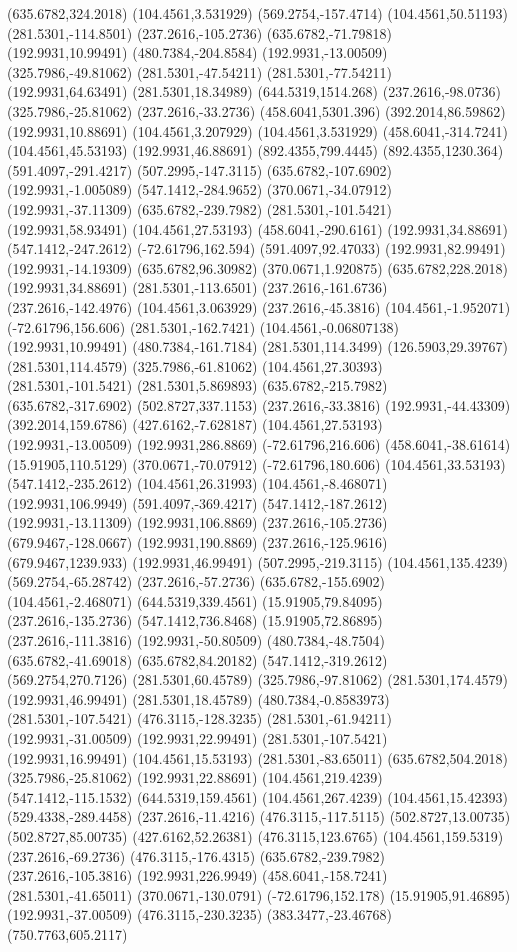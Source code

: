 \documentclass[12pt,letterpaper]{article}
\begin{document}
(635.6782,324.2018) (104.4561,3.531929) (569.2754,-157.4714) (104.4561,50.51193) (281.5301,-114.8501) (237.2616,-105.2736) (635.6782,-71.79818) (192.9931,10.99491) (480.7384,-204.8584) (192.9931,-13.00509) (325.7986,-49.81062) (281.5301,-47.54211) (281.5301,-77.54211) (192.9931,64.63491) (281.5301,18.34989) (644.5319,1514.268) (237.2616,-98.0736) (325.7986,-25.81062) (237.2616,-33.2736) (458.6041,5301.396) (392.2014,86.59862) (192.9931,10.88691) (104.4561,3.207929) (104.4561,3.531929) (458.6041,-314.7241) (104.4561,45.53193) (192.9931,46.88691) (892.4355,799.4445) (892.4355,1230.364) (591.4097,-291.4217) (507.2995,-147.3115) (635.6782,-107.6902) (192.9931,-1.005089) (547.1412,-284.9652) (370.0671,-34.07912) (192.9931,-37.11309) (635.6782,-239.7982) (281.5301,-101.5421) (192.9931,58.93491) (104.4561,27.53193) (458.6041,-290.6161) (192.9931,34.88691) (547.1412,-247.2612) (-72.61796,162.594) (591.4097,92.47033) (192.9931,82.99491) (192.9931,-14.19309) (635.6782,96.30982) (370.0671,1.920875) (635.6782,228.2018) (192.9931,34.88691) (281.5301,-113.6501) (237.2616,-161.6736) (237.2616,-142.4976) (104.4561,3.063929) (237.2616,-45.3816) (104.4561,-1.952071) (-72.61796,156.606) (281.5301,-162.7421) (104.4561,-0.06807138) (192.9931,10.99491) (480.7384,-161.7184) (281.5301,114.3499) (126.5903,29.39767) (281.5301,114.4579) (325.7986,-61.81062) (104.4561,27.30393) (281.5301,-101.5421) (281.5301,5.869893) (635.6782,-215.7982) (635.6782,-317.6902) (502.8727,337.1153) (237.2616,-33.3816) (192.9931,-44.43309) (392.2014,159.6786) (427.6162,-7.628187) (104.4561,27.53193) (192.9931,-13.00509) (192.9931,286.8869) (-72.61796,216.606) (458.6041,-38.61614) (15.91905,110.5129) (370.0671,-70.07912) (-72.61796,180.606) (104.4561,33.53193) (547.1412,-235.2612) (104.4561,26.31993) (104.4561,-8.468071) (192.9931,106.9949) (591.4097,-369.4217) (547.1412,-187.2612) (192.9931,-13.11309) (192.9931,106.8869) (237.2616,-105.2736) (679.9467,-128.0667) (192.9931,190.8869) (237.2616,-125.9616) (679.9467,1239.933) (192.9931,46.99491) (507.2995,-219.3115) (104.4561,135.4239) (569.2754,-65.28742) (237.2616,-57.2736) (635.6782,-155.6902) (104.4561,-2.468071) (644.5319,339.4561) (15.91905,79.84095) (237.2616,-135.2736) (547.1412,736.8468) (15.91905,72.86895) (237.2616,-111.3816) (192.9931,-50.80509) (480.7384,-48.7504) (635.6782,-41.69018) (635.6782,84.20182) (547.1412,-319.2612) (569.2754,270.7126) (281.5301,60.45789) (325.7986,-97.81062) (281.5301,174.4579) (192.9931,46.99491) (281.5301,18.45789) (480.7384,-0.8583973) (281.5301,-107.5421) (476.3115,-128.3235) (281.5301,-61.94211) (192.9931,-31.00509) (192.9931,22.99491) (281.5301,-107.5421) (192.9931,16.99491) (104.4561,15.53193) (281.5301,-83.65011) (635.6782,504.2018) (325.7986,-25.81062) (192.9931,22.88691) (104.4561,219.4239) (547.1412,-115.1532) (644.5319,159.4561) (104.4561,267.4239) (104.4561,15.42393) (529.4338,-289.4458) (237.2616,-11.4216) (476.3115,-117.5115) (502.8727,13.00735) (502.8727,85.00735) (427.6162,52.26381) (476.3115,123.6765) (104.4561,159.5319) (237.2616,-69.2736) (476.3115,-176.4315) (635.6782,-239.7982) (237.2616,-105.3816) (192.9931,226.9949) (458.6041,-158.7241) (281.5301,-41.65011) (370.0671,-130.0791) (-72.61796,152.178) (15.91905,91.46895) (192.9931,-37.00509) (476.3115,-230.3235) (383.3477,-23.46768) (750.7763,605.2117) 
\end{document}
